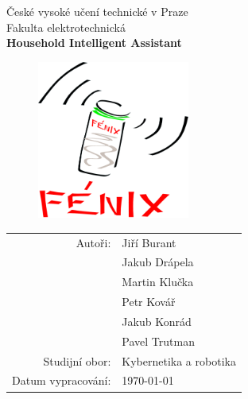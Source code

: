\documentclass[12pt,a4paper]{article}
\author{Jakub Drápela}
\begin{document}
\pagestyle{empty}


	\begin{center}

\large

České vysoké učení technické v Praze\\
\medskip
Fakulta elektrotechnická\\[2cm]
{\LARGE\bfseries Household Intelligent Assistant}

\vfill
\begin{figure}[h!]
\begin{center}
\includegraphics[width = 5cm]{logo.pdf} 
\end{center}
\end{figure}
\vfill

\begin{tabular}{rl}

Autoři: & Jiří Burant \\
\noalign{\vspace{1mm}}
		& Jakub Drápela \\
		\noalign{\vspace{1mm}}
		& Martin Klučka\\
		\noalign{\vspace{1mm}}
		& Petr Kovář \\
		\noalign{\vspace{1mm}}
		& Jakub Konrád\\
		\noalign{\vspace{1mm}}
		& Pavel Trutman\\
\noalign{\vspace{2mm}}
Studijní obor: & Kybernetika a robotika \\
\noalign{\vspace{2mm}}
Datum vypracování: & \today\\
\end{tabular}

\end{center}
\end{document}
